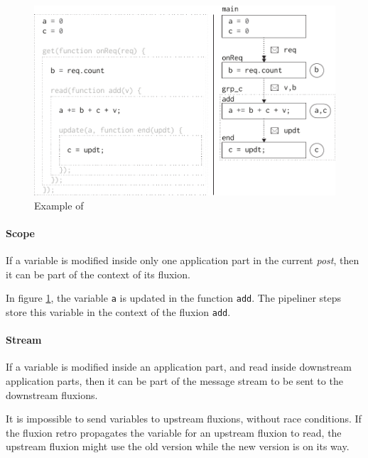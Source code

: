 \begin{figure}[h!]
\begin{center}
  \includegraphics[width=\linewidth]{ressources/states.pdf}
  \caption{Example of }
  \label{fig:states}
\end{center}
\end{figure}

\paragraph{Scope}
If a variable is modified inside only one application part in the current \textit{post}, then it can be part of the context of its fluxion.

In figure \ref{fig:states}, the variable \texttt{a} is updated in the function \texttt{add}.
The pipeliner steps store this variable in the context of the fluxion \texttt{add}.

\paragraph{Stream}
If a variable is modified inside an application part, and read inside downstream application parts, then it can be part of the message stream to be sent to the downstream fluxions.

It is impossible to send variables to upstream flux\-ions, without race conditions.
If the fluxion retro propagates the variable for an upstream fluxion to read, the upstream fluxion might use the old version while the new version is on its way.

